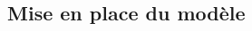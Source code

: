 \documentclass[10pt,fleqn]{article} %
\begin{document}
\begin{multicols}{2}
\subsection*{Mise en place du modèle}

%



\end{multicols}
\end{document}
